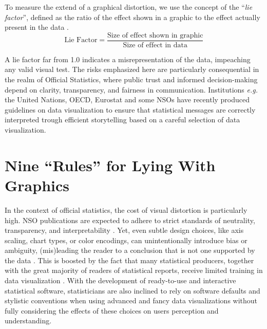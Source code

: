 \documentclass[11pt,twoside,a4paper]{article}
\begin{document}
 To measure the extend of a graphical distortion, we use the concept of the “\emph{lie factor}”, defined  as the ratio of the effect shown in a graphic to the effect actually present in the data \citep{Tufte2001}. 
 \begin{equation}
 \nonumber
\text{Lie Factor} = \frac{\text{Size of effect shown in graphic}}{\text{Size of effect in data}}
\end{equation}
 
 A lie factor far from 1.0 indicates a misrepresentation of the data, impeaching any valid visual test.  The risks emphasized here are particularly consequential in the realm of Official Statistics, where public trust and informed decision-making depend on clarity, transparency, and fairness in communication. Institutions \textit{e.g.} the United Nations, OECD, Eurostat  \citep{UNSD2024StoryTelling, OECD2017, Eurostat2022} and some NSOs \citep{ONS2020} have recently produced guidelines on data visualization to ensure that statistical messages are correctly interpreted trough efficient storytelling based on a  careful selection of data visualization.
 

\section{Nine ``Rules'' for Lying With Graphics}

In the context of official statistics, the cost of visual distortion is particularly high. NSO publications are expected to adhere to strict standards of neutrality, transparency, and interpretability \citep{FPOS1994}. Yet, even subtle design choices, like axis scaling, chart types, or color encodings, can unintentionally introduce bias or ambiguity, (mis)leading the reader to a conclusion that is not one supported by the data  \citep{Cairo2019}. This is boosted by the fact that many statistical producers, together with  the great majority of readers of statistical reports, receive limited training in data visualization \citep{Radermacher2021Literacy, damouras2021}. With the development of ready-to-use  and interactive statistical software, statisticians are also inclined to rely on software defaults and stylistic conventions when using advanced and fancy data visualizations without fully considering the effects of these choices on users perception and understanding.
\end{document}
